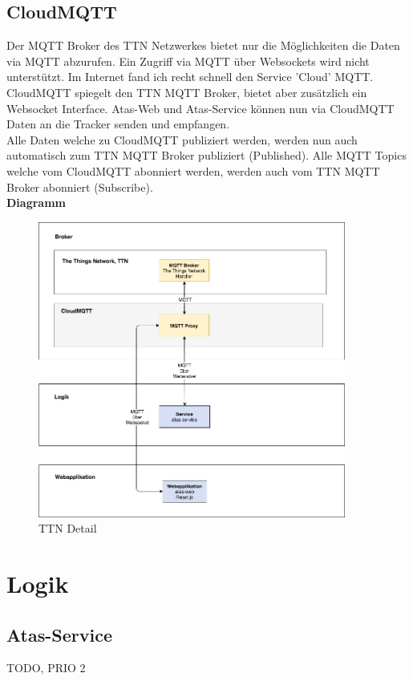 \documentclass[11pt,english,german]{report}
\theoremstyle{definition}
\begin{document}
\subsection{CloudMQTT}
Der MQTT Broker des TTN Netzwerkes bietet nur die Möglichkeiten die Daten via MQTT abzurufen. Ein Zugriff via MQTT über Websockets wird nicht unterstützt. Im Internet fand ich recht schnell den Service 'Cloud' MQTT.   CloudMQTT spiegelt den TTN MQTT Broker, bietet aber zusätzlich ein Websocket Interface. Atas-Web und Atas-Service können nun via CloudMQTT Daten an die Tracker senden und empfangen.\\[0.3cm]
Alle Daten welche zu CloudMQTT publiziert werden, werden nun auch automatisch zum TTN MQTT Broker publiziert (Published). Alle MQTT Topics welche vom CloudMQTT abonniert werden, werden auch vom TTN MQTT Broker abonniert (Subscribe).  \\[0.3cm]
\textbf{Diagramm}
\begin{figure}[H]
	\centering
	\includegraphics[width=0.9\textwidth]{img/system/ATAS_SystemOverview_CloudMQTT_BA.png}
	\caption[TTN Detail]
	{TTN Detail}
\end{figure}

\newpage
\section{Logik}
\subsection{Atas-Service}
TODO, PRIO 2
\end{document}

